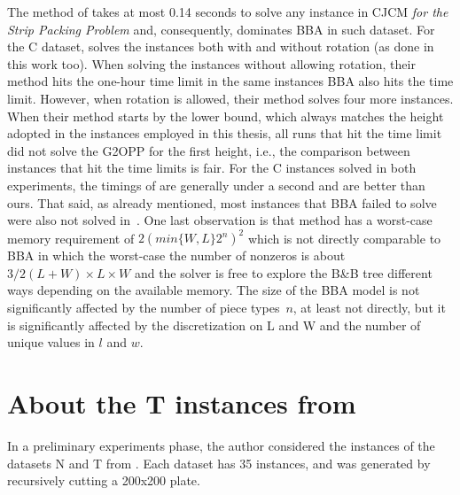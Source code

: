 The method of \citet{fleszar:2016} takes at most 0.14 seconds to solve any instance in CJCM \emph{for the Strip Packing Problem} and, consequently, dominates BBA in such dataset.
For the C dataset, \citet{fleszar:2016} solves the instances both with and without rotation (as done in this work too).
When solving the instances without allowing rotation, their method hits the one-hour time limit in the same instances BBA also hits the time limit.
However, when rotation is allowed, their method solves four more instances.
When their method starts by the lower bound, which always matches the height adopted in the instances employed in this thesis, all runs that hit the time limit did not solve the G2OPP for the first height, i.e., the comparison between instances that hit the time limits is fair.
For the C instances solved in both experiments, the timings of \citet{fleszar:2016} are generally under a second and are better than ours.
That said, as already mentioned, most instances that BBA failed to solve were also not solved in~\citet{fleszar:2016}.
One last observation is that \citet{fleszar:2016} method has a worst-case memory requirement of \(2(min\{W,L\}2^n)^2\) which is not directly comparable to BBA in which the worst-case the number of nonzeros is about \(3/2(L + W) \times L \times W\) and the solver is free to explore the B\&B tree different ways depending on the available memory.
The size of the BBA model is not significantly affected by the number of piece types~\(n\), at least not directly, but it is significantly affected by the discretization on L and W and the number of unique values in \(l\) and \(w\).

\section{About the T instances from \protect\citethopperthesis}
\label{sec:about_T_instances}

In a preliminary experiments phase, the author considered the instances of the datasets N and T from \citet{hopper_thesis}. %
Each dataset has 35 instances, and was generated by recursively cutting a 200x200 plate. %


